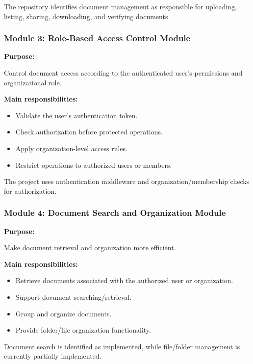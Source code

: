 \documentclass[12pt]{article}
\begin{document}
The repository identifies document management as responsible for uploading, listing, sharing, downloading, and verifying documents.


\subsubsection{Module 3: Role-Based Access Control Module}

\textbf{Purpose:}

Control document access according to the authenticated user's permissions and organizational role.

\textbf{Main responsibilities:}

\begin{itemize}
    \item Validate the user's authentication token.
    \item Check authorization before protected operations.
    \item Apply organization-level access rules.
    \item Restrict operations to authorized users or members.
\end{itemize}

The project uses authentication middleware and organization/membership checks for authorization.


\subsubsection{Module 4: Document Search and Organization Module}

\textbf{Purpose:}

Make document retrieval and organization more efficient.

\textbf{Main responsibilities:}

\begin{itemize}
    \item Retrieve documents associated with the authorized user or organization.
    \item Support document searching/retrieval.
    \item Group and organize documents.
    \item Provide folder/file organization functionality.
\end{itemize}

Document search is identified as implemented, while file/folder management is currently partially implemented.
\end{document}
